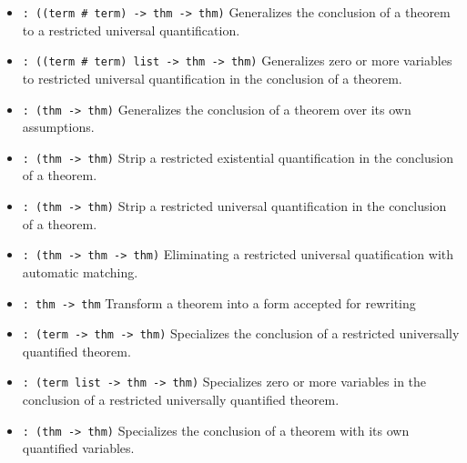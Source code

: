 \documentclass[12pt]{article}
\begin{document}
\begin{itemize}
\item {} \verb|: ((term # term) -> thm -> thm)|\newline
Generalizes the conclusion of a theorem to a restricted universal quantification.

\item {} \verb|: ((term # term) list -> thm -> thm)|\newline
Generalizes zero or more variables to restricted universal quantification
in the conclusion of a theorem.

\item {} \verb|: (thm -> thm)|\newline
Generalizes the conclusion of a theorem over its own assumptions.

\item {} \verb|: (thm -> thm)|\newline
Strip a restricted existential quantification in the conclusion of a theorem.

\item {} \verb|: (thm -> thm)|\newline
Strip a restricted universal quantification in the conclusion of a theorem.

\item {} \verb|: (thm -> thm -> thm)|\newline
Eliminating a restricted universal quatification with automatic matching.

\item {} \verb|: thm -> thm|\newline
Transform a theorem into a form accepted for rewriting

\item {} \verb|: (term -> thm -> thm)|\newline
Specializes the conclusion of a restricted universally quantified theorem.

\item {} \verb|: (term list -> thm -> thm)|\newline
Specializes zero or more variables in the conclusion of a restricted
universally quantified theorem.

\item {} \verb|: (thm -> thm)|\newline
Specializes the conclusion of a theorem with its own quantified variables.
\end{itemize}
\end{document}
